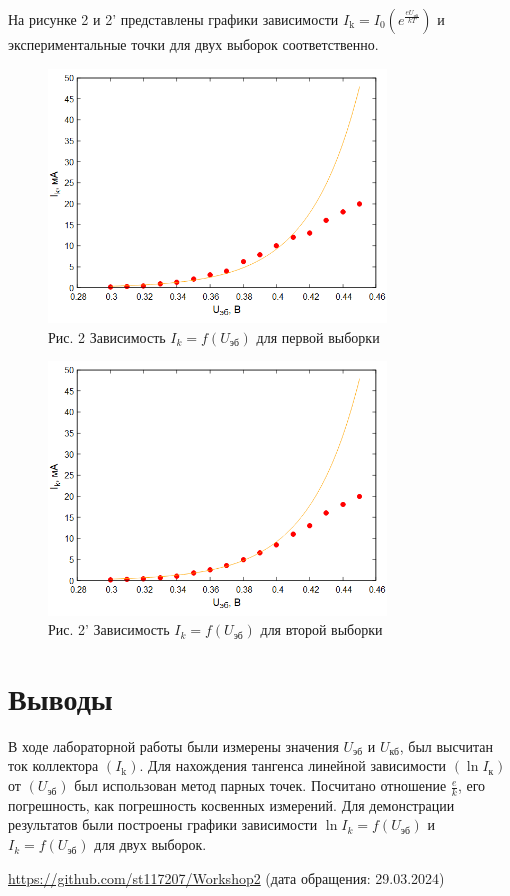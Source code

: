 На рисунке 2 и 2' представлены графики зависимости $    I_{\mathrm{k}} = I_{0} \left(e^{\frac{e U_{\text{эб}}}{k T}}\right)$ и экспериментальные точки для двух выборок соответственно. 
\begin{figure}[H]
\centering
\includegraphics[width=0.8\textwidth]{График 3.png}
\caption*{Рис. 2 Зависимость $I_k=f(U_{\text{эб}})$ для первой выборки }
\label{fig:gist}
\end{figure}
\begin{figure}[H]
\centering
\includegraphics[width=0.8\textwidth]{График 4.png}
\caption*{Рис. 2' Зависимость $I_k=f(U_{\text{эб}})$ для второй выборки}
\label{fig:gist}
\end{figure}
\section{Выводы}
В ходе лабораторной работы были измерены значения $U_{\text{эб}}$ и $U_{\text{кб}}$, был высчитан ток коллектора $(I_{\text{k}})$. Для нахождения тангенса линейной зависимости $(\ln I_{\text{к}})$ от $(U_{\text{эб}})$ был использован метод парных точек. Посчитано отношение $\frac{e}{k}$, его погрешность, как погрешность косвенных измерений. Для демонстрации результатов были построены графики зависимости $\ln I_k=f(U_{\text{эб}})$ и $I_k=f(U_{\text{эб}})$ для двух выборок.


\begin{thebibliography}{9}

\url{https://github.com/st117207/Workshop2}  (дата обращения: 29.03.2024) 


\end{thebibliography}

